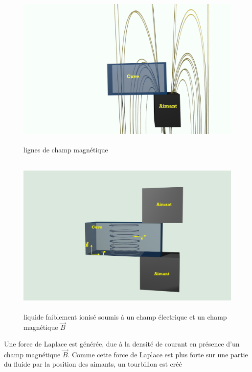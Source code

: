 \documentclass[a4paper,12pt,titlepage]{report}
\begin{document}
\begin{onehalfspace}
\begin{figure}[!h]
\begin{center}
		\includegraphics[height = 8cm, keepaspectratio]{graphes/blender_cuve_mag2.png} 
		\caption{lignes de champ magnétique}
	\end{center}
\end{figure}
\newpage
\begin{figure}[h]
	\begin{center}
	\centering	
		\includegraphics[height = 8cm, keepaspectratio]{graphes/champvec2.png}
		\caption{liquide faiblement ionisé soumis à un champ électrique et un champ magnétique $\vec{B}$}
	\end{center}
\end{figure}
Une force de Laplace est générée, due à la densité de courant en présence d’un champ magnétique $\vec{B}$. Comme cette force de Laplace est plus forte sur une partie du fluide par la position des aimants, un tourbillon est créé

\end{onehalfspace}
\end{document}
